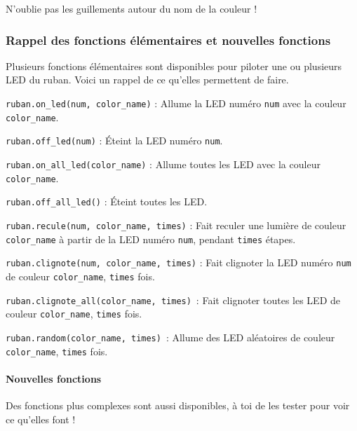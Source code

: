 N'oublie pas les guillements autour du nom de la couleur !

\subsubsection{Rappel des fonctions élémentaires et nouvelles fonctions}

Plusieurs fonctions élémentaires sont disponibles pour piloter une ou plusieurs LED du ruban. Voici un rappel
de ce qu'elles permettent de faire. \par

\color{blue}
\texttt{ruban.on\_led(num, color\_name)} : \color{black} Allume la LED numéro \texttt{num} avec la couleur \texttt{color\_name}. \par
\vspace{1em}
\color{blue}\texttt{ruban.off\_led(num)} : \color{black} Éteint la LED numéro \texttt{num}. \par
\vspace{1em}
\color{blue}\texttt{ruban.on\_all\_led(color\_name)} : \color{black} Allume toutes les LED avec la couleur \texttt{color\_name}. \par
\vspace{1em}
\color{blue}\texttt{ruban.off\_all\_led()} : \color{black} Éteint toutes les LED. \par
\vspace{1em}
\color{blue}\texttt{ruban.recule(num, color\_name, times)} : \color{black} Fait reculer une lumière de couleur \texttt{color\_name} à partir de la LED numéro \texttt{num}, pendant \texttt{times} étapes. \par
\vspace{1em}
\color{blue}\texttt{ruban.clignote(num, color\_name, times)} : \color{black} Fait clignoter la LED numéro \texttt{num} de couleur \texttt{color\_name}, \texttt{times} fois. \par
\vspace{1em}
\color{blue}\texttt{ruban.clignote\_all(color\_name, times)}\ : \color{black} Fait clignoter toutes les LED de couleur \texttt{color\_name}, \texttt{times} fois.\ \par
\vspace{1em}
\color{blue}\texttt{ruban.random(color\_name, times)}\ : \color{black} Allume des LED aléatoires de couleur \texttt{color\_name}, \texttt{times} fois.\ \par
\vspace{1em}

\paragraph{Nouvelles fonctions}
Des fonctions plus complexes sont aussi disponibles, à toi de les tester pour voir ce qu'elles font ! \par


